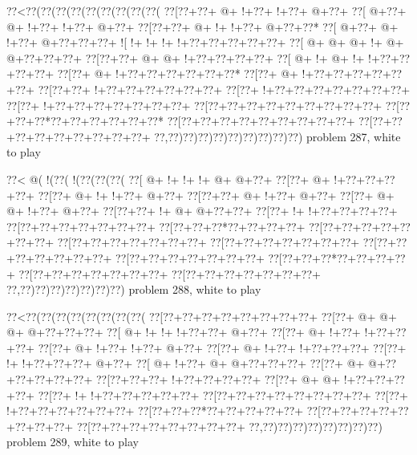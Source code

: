 \vbox{\vbox{\goo
\0??<\0??(\0??(\0??(\0??(\0??(\0??(\0??(\0??(\0??(
\0??[\0??+\0??+\- @+\- !+\0??+\- !+\0??+\- @+\0??+
\0??[\- @+\0??+\- @+\- !+\0??+\- !+\0??+\- @+\0??+
\0??[\0??+\0??+\- @+\- !+\- !+\0??+\- @+\0??+\0??*
\0??[\- @+\0??+\- @+\- !+\0??+\- @+\0??+\0??+\0??+
\- ![\- !+\- !+\- !+\- !+\0??+\0??+\0??+\0??+\0??+
\0??[\- @+\- @+\- @+\- !+\- @+\- @+\0??+\0??+\0??+
\0??[\0??+\0??+\- @+\- @+\- !+\0??+\0??+\0??+\0??+
\0??[\- @+\- !+\- @+\- !+\- !+\0??+\0??+\0??+\0??+
\0??[\0??+\- @+\- !+\0??+\0??+\0??+\0??+\0??+\0??*
\0??[\0??+\- @+\- !+\0??+\0??+\0??+\0??+\0??+\0??+
\0??[\0??+\0??+\- !+\0??+\0??+\0??+\0??+\0??+\0??+
\0??[\0??+\- !+\0??+\0??+\0??+\0??+\0??+\0??+\0??+
\0??[\0??+\- !+\0??+\0??+\0??+\0??+\0??+\0??+\0??+
\0??[\0??+\0??+\0??+\0??+\0??+\0??+\0??+\0??+\0??+
\0??[\0??+\0??+\0??*\0??+\0??+\0??+\0??+\0??+\0??*
\0??[\0??+\0??+\0??+\0??+\0??+\0??+\0??+\0??+\0??+
\0??[\0??+\0??+\0??+\0??+\0??+\0??+\0??+\0??+\0??+
\0??,\0??)\0??)\0??)\0??)\0??)\0??)\0??)\0??)\0??)
}
\hfil problem 287, white to play\hfil\break
}

\vbox{\vbox{\goo
\0??<\- @(\- !(\0??(\- !(\0??(\0??(\0??(
\0??[\- @+\- !+\- !+\- !+\- @+\- @+\0??+
\0??[\0??+\- @+\- !+\0??+\0??+\0??+\0??+
\0??[\0??+\- @+\- !+\- !+\0??+\- @+\0??+
\0??[\0??+\0??+\- @+\- !+\0??+\- @+\0??+
\0??[\0??+\- @+\- @+\- !+\0??+\- @+\0??+
\0??[\0??+\0??+\- !+\- @+\- @+\0??+\0??+
\0??[\0??+\- !+\- !+\0??+\0??+\0??+\0??+
\0??[\0??+\0??+\0??+\0??+\0??+\0??+\0??+
\0??[\0??+\0??+\0??*\0??+\0??+\0??+\0??+
\0??[\0??+\0??+\0??+\0??+\0??+\0??+\0??+
\0??[\0??+\0??+\0??+\0??+\0??+\0??+\0??+
\0??[\0??+\0??+\0??+\0??+\0??+\0??+\0??+
\0??[\0??+\0??+\0??+\0??+\0??+\0??+\0??+
\0??[\0??+\0??+\0??+\0??+\0??+\0??+\0??+
\0??[\0??+\0??+\0??*\0??+\0??+\0??+\0??+
\0??[\0??+\0??+\0??+\0??+\0??+\0??+\0??+
\0??[\0??+\0??+\0??+\0??+\0??+\0??+\0??+
\0??,\0??)\0??)\0??)\0??)\0??)\0??)\0??)
}
\hfil problem 288, white to play\hfil\break
}

\vbox{\vbox{\goo
\0??<\0??(\0??(\0??(\0??(\0??(\0??(\0??(\0??(
\0??[\0??+\0??+\0??+\0??+\0??+\0??+\0??+\0??+
\0??[\0??+\- @+\- @+\- @+\- @+\0??+\0??+\0??+
\0??[\- @+\- !+\- !+\- !+\0??+\0??+\- @+\0??+
\0??[\0??+\- @+\- !+\0??+\- !+\0??+\0??+\0??+
\0??[\0??+\- @+\- !+\0??+\- !+\0??+\- @+\0??+
\0??[\0??+\- @+\- !+\0??+\- !+\0??+\0??+\0??+
\0??[\0??+\- !+\- !+\0??+\0??+\0??+\- @+\0??+
\0??[\- @+\- !+\0??+\- @+\- @+\0??+\0??+\0??+
\0??[\0??+\- @+\- @+\0??+\0??+\0??+\0??+\0??+
\0??[\0??+\0??+\0??+\- !+\0??+\0??+\0??+\0??+
\0??[\0??+\- @+\- @+\- !+\0??+\0??+\0??+\0??+
\0??[\0??+\- !+\- !+\0??+\0??+\0??+\0??+\0??+
\0??[\0??+\0??+\0??+\0??+\0??+\0??+\0??+\0??+
\0??[\0??+\- !+\0??+\0??+\0??+\0??+\0??+\0??+
\0??[\0??+\0??+\0??*\0??+\0??+\0??+\0??+\0??+
\0??[\0??+\0??+\0??+\0??+\0??+\0??+\0??+\0??+
\0??[\0??+\0??+\0??+\0??+\0??+\0??+\0??+\0??+
\0??,\0??)\0??)\0??)\0??)\0??)\0??)\0??)\0??)
}
\hfil problem 289, white to play\hfil\break
}


